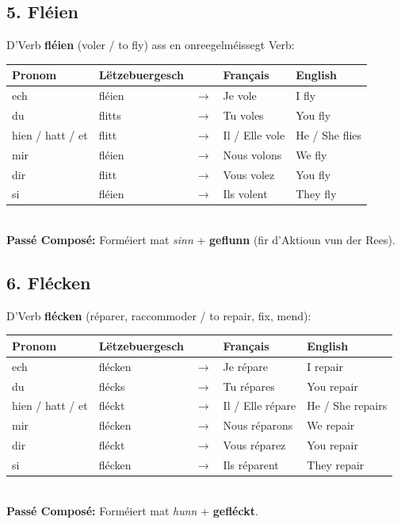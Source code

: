 \subsection*{5. Fléien}
D'Verb \textbf{fléien} (voler / to fly) ass en onreegelméissegt Verb:

\begin{tabular}{ll c l l}
    \toprule
    \textbf{Pronom} & \textbf{Lëtzebuergesch} & \textbf{} & \textbf{Français} & \textbf{English} \\
    \midrule
    ech & fléien & $\rightarrow$ & Je vole & I fly \\
    du & flitts & $\rightarrow$ & Tu voles & You fly \\
    hien / hatt / et & flitt & $\rightarrow$ & Il / Elle vole & He / She flies \\
    \midrule
    mir & fléien & $\rightarrow$ & Nous volons & We fly \\
    dir & flitt & $\rightarrow$ & Vous volez & You fly \\
    si & fléien & $\rightarrow$ & Ils volent & They fly \\
    \bottomrule
\end{tabular}
\\[0.5em]
\textbf{Passé Composé:} Forméiert mat \textit{sinn} + \textbf{geflunn} (fir d'Aktioun vun der Rees).

\subsection*{6. Flécken}
D'Verb \textbf{flécken} (réparer, raccommoder / to repair, fix, mend):

\begin{tabular}{ll c l l}
    \toprule
    \textbf{Pronom} & \textbf{Lëtzebuergesch} & \textbf{} & \textbf{Français} & \textbf{English} \\
    \midrule
    ech & flécken & $\rightarrow$ & Je répare & I repair \\
    du & flécks & $\rightarrow$ & Tu répares & You repair \\
    hien / hatt / et & fléckt & $\rightarrow$ & Il / Elle répare & He / She repairs \\
    \midrule
    mir & flécken & $\rightarrow$ & Nous réparons & We repair \\
    dir & fléckt & $\rightarrow$ & Vous réparez & You repair \\
    si & flécken & $\rightarrow$ & Ils réparent & They repair \\
    \bottomrule
\end{tabular}
\\[0.5em]
\textbf{Passé Composé:} Forméiert mat \textit{hunn} + \textbf{gefléckt}.

